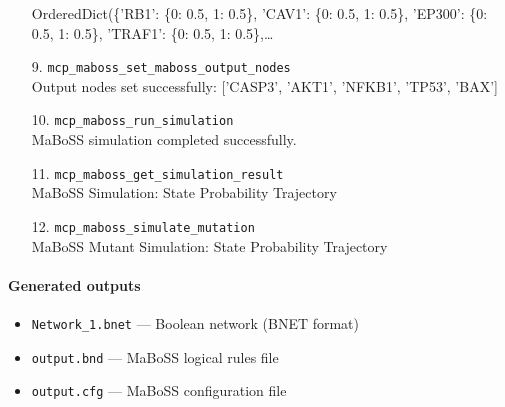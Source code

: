 \begin{enumerate}
\RaggedRight OrderedDict(\{'RB1': \{0: 0.5, 1: 0.5\}, 'CAV1': \{0: 0.5, 1: 0.5\}, 'EP300': \{0: 0.5, 1: 0.5\}, 'TRAF1': \{0: 0.5, 1: 0.5\},\ldots{}
\item[9.] \texttt{mcp\_\allowbreak{}maboss\_\allowbreak{}set\_\allowbreak{}maboss\_\allowbreak{}output\_\allowbreak{}nodes}
\hfill\\
\RaggedRight Output nodes set successfully: ['CASP3', 'AKT1', 'NFKB1', 'TP53', 'BAX']
\item[10.] \texttt{mcp\_\allowbreak{}maboss\_\allowbreak{}run\_\allowbreak{}simulation}
\hfill\\
\RaggedRight MaBoSS simulation completed successfully.
\item[11.] \texttt{mcp\_\allowbreak{}maboss\_\allowbreak{}get\_\allowbreak{}simulation\_\allowbreak{}result}
\hfill\\
\RaggedRight MaBoSS Simulation: State Probability Trajectory
\item[12.] \texttt{mcp\_\allowbreak{}maboss\_\allowbreak{}simulate\_\allowbreak{}mutation}
\hfill\\
\RaggedRight MaBoSS Mutant Simulation: State Probability Trajectory
\end{enumerate}
\endgroup

\paragraph{Generated outputs}
\begin{itemize}
\item \texttt{Network\_\allowbreak{}1.\allowbreak{}bnet} — Boolean network (BNET format)
\item \texttt{output.\allowbreak{}bnd} — MaBoSS logical rules file
\item \texttt{output.\allowbreak{}cfg} — MaBoSS configuration file
\end{itemize}
